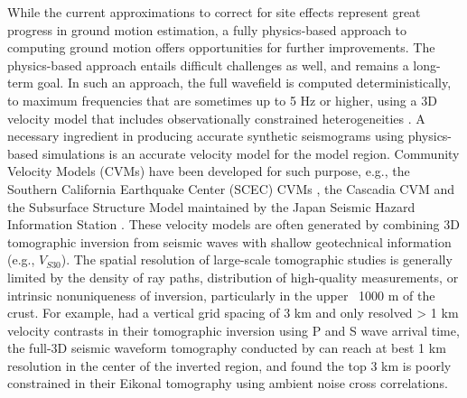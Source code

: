 While the current approximations to correct for site effects represent great progress in ground motion estimation, a fully physics-based approach to computing ground motion offers opportunities for further improvements. The physics-based approach entails difficult challenges as well, and remains a long-term goal. In such an approach, the full wavefield is computed deterministically, to maximum frequencies that are sometimes up to 5 Hz or higher, using a 3D velocity model that includes observationally constrained heterogeneities \citep{savranGroundMotionSimulation2019,withersGroundMotionIntraevent2019,hu05HzDeterministic2021}. A necessary ingredient in producing accurate synthetic seismograms using physics-based simulations is an accurate velocity model for the model region. Community Velocity Models (CVMs) have been developed for such purpose, e.g., the Southern California Earthquake Center (SCEC) CVMs \citep{smallSCECUnifiedCommunity2017}, the Cascadia CVM \citep{stephensonCascadiaSubductionZone2017} and the Subsurface Structure Model maintained by the Japan Seismic Hazard Information Station \citep{fujiwaraJSHISINTEGRATEDSYSTEM2017}. These velocity models are often generated by combining 3D tomographic inversion from seismic waves \citep{tapeAdjointTomographySouthern2009,tapeSeismicTomographySouthern2010,leeFull3DTomographyCrustal2014} with shallow geotechnical information (e.g., $V_{S30}$). The spatial resolution of large-scale tomographic studies is generally limited by the density of ray paths, distribution of high-quality measurements, or intrinsic nonuniqueness of inversion, particularly in the upper ~1000 m of the crust. For example, \citet{linThreedimensionalCrustalSeismic2007} had a vertical grid spacing of 3 km and only resolved > 1 km velocity contrasts in their tomographic inversion using P and S wave arrival time, the full-3D seismic waveform tomography conducted by \citet{leeFull3DTomographyCrustal2014} can reach at best 1 km resolution in the center of the inverted region, and \citet{qiuEikonalTomographySouthern2019} found the top 3 km is poorly constrained in their Eikonal tomography using ambient noise cross correlations.



